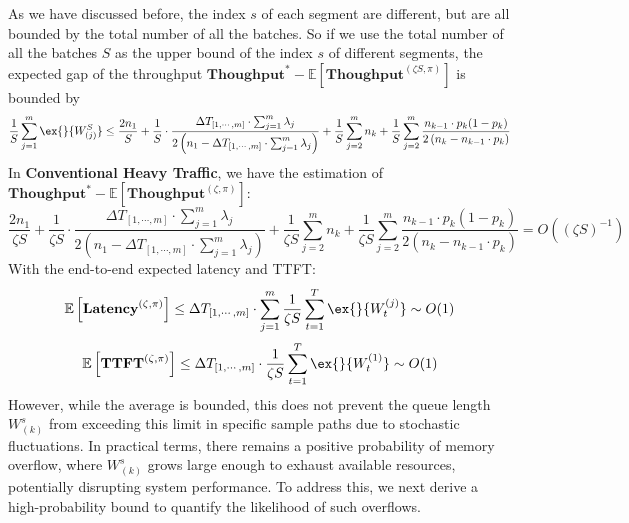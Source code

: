 \documentclass[preprint]{article}
\newcommand{\throughput}{\textbf{Thoughput}}
\newcommand{\Latency}{\textbf{Latency}}
\newcommand{\TTFT}{\textbf{TTFT}}
\theoremstyle{plain}
\theoremstyle{definition}
\theoremstyle{remark}
\begin{document}
As we have discussed before, the index $s$ of each segment are different, but are all bounded by the total number of all the batches. So if we use the total number of all the batches $S$ as the upper bound of the index $s$ of different segments, the expected gap of the throughput $\throughput^* - \mathbb{E}[\throughput^{(\zeta S, \pi)}]$ is bounded by
$$\frac{1}{S}\sum_{j=1}^m \ex{}{W^S_{(j)}}\leq
\frac{2n_1}{S} +\frac{1}{S} \cdot\frac{\Delta T_{ [1,\cdots,m] }\cdot \sum_{j=1}^m \lambda_j}{2\left( n_1 - \Delta T_{ [1,\cdots,m] }\cdot \sum_{j=1}^m \lambda_j\right)} +\frac{1}{S}\sum_{j=2}^m n_k +\frac{1}{S}\sum_{j=2}^m\frac{n_{k-1}\cdot p_k(1-p_k)}{2\left(n_{k}-n_{k-1}\cdot p_k\right)}$$
In \textbf{Conventional Heavy Traffic}, we have the estimation of $\throughput^* - \mathbb{E}[\throughput^{(\zeta , \pi)}]$:
$$\frac{2n_1}{\zeta S} +\frac{1}{\zeta S} \cdot\frac{\Delta T_{ [1,\cdots,m] }\cdot \sum_{j=1}^m \lambda_j}{2\left( n_1 - \Delta T_{ [1,\cdots,m] }\cdot \sum_{j=1}^m \lambda_j\right)}+\frac{1}{\zeta S}\sum_{j=2}^m n_k +\frac{1}{\zeta S}\sum_{j=2}^m\frac{n_{k-1}\cdot p_k(1-p_k)}{2\left(n_{k}-n_{k-1}\cdot p_k\right)} = O((\zeta S)^{-1})$$
With the end-to-end expected latency and TTFT:
$$\mathbb{E}\left[ \Latency^{(\zeta , \pi)} \right]\leq \Delta T_{[1,\cdots,m]}\cdot \sum_{j=1}^m \frac{1}{\zeta S}\sum_{t=1}^T\ex{}{W_t^{(j)}} \sim O(1)$$
$$\mathbb{E}\left[ \TTFT^{(\zeta , \pi)} \right]\leq \Delta T_{[1,\cdots,m]}\cdot \frac{1}{\zeta S}\sum_{t=1}^T\ex{}{W_t^{(1)}} \sim O(1)$$
However, while the average is bounded, this does not prevent the queue length $W^s_{(k)}$ from exceeding this limit in specific sample paths due to stochastic fluctuations. In practical terms, there remains a positive probability of memory overflow, where $W^s_{(k)}$ grows large enough to exhaust available resources, potentially disrupting system performance. To address this, we next derive a high-probability bound to quantify the likelihood of such overflows.
\end{document}

